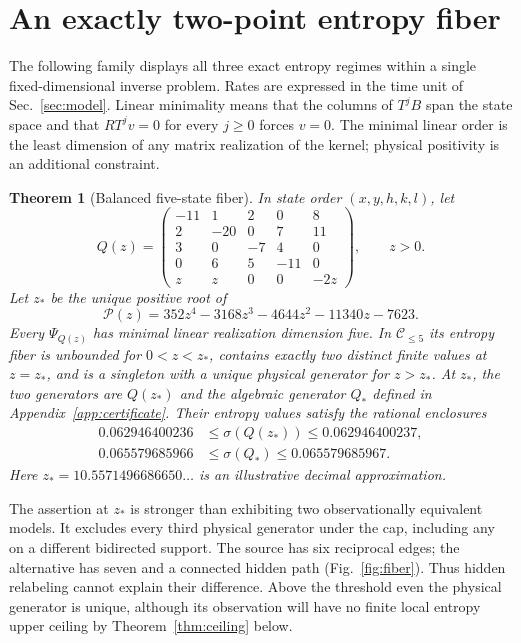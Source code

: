 \documentclass[aps,pre,onecolumn,11pt,longbibliography,notitlepage]{revtex4-2}
\newtheorem{theorem}{Theorem}
\newcommand{\1}{\mathbf 1}
\newcommand{\C}{\mathcal C}
\newcommand{\sig}{\sigma}
\newcommand{\zs}{z_*}
\begin{document}
\section{An exactly two-point entropy fiber}\label{sec:balanced}
The following family displays all three exact entropy regimes within a single fixed-dimensional inverse problem. Rates are expressed in the time unit of Sec.~\ref{sec:model}. Linear minimality means that the columns of $T^jB$ span the state space and that $RT^jv=0$ for every $j\ge0$ forces $v=0$. The minimal linear order is the least dimension of any matrix realization of the kernel; physical positivity is an additional constraint.
\begin{theorem}[Balanced five-state fiber]\label{thm:balanced}
In state order $(x,y,h,k,l)$, let
\begin{equation}
 Q(z)=\begin{pmatrix}
 -11&1&2&0&8\\2&-20&0&7&11\\3&0&-7&4&0\\
 0&6&5&-11&0\\z&z&0&0&-2z
 \end{pmatrix},\qquad z>0.\label{eq:theta}
\end{equation}
Let $\zs$ be the unique positive root of
\begin{equation}
 \mathcal P(z)=352z^4-3168z^3-4644z^2-11340z-7623.\label{eq:quartic}
\end{equation}
Every $\Psi_{Q(z)}$ has minimal linear realization dimension five. In $\C_{\le5}$ its entropy fiber is unbounded for $0<z<\zs$, contains exactly two distinct finite values at $z=\zs$, and is a singleton with a unique physical generator for $z>\zs$. At $\zs$, the two generators are $Q(\zs)$ and the algebraic generator $Q_*$ defined in Appendix~\ref{app:certificate}. Their entropy values satisfy the rational enclosures
\begin{align}
 0.062946400236&\le\sig(Q(\zs))\le0.062946400237,\label{eq:sig1}\\
 0.065579685966&\le\sig(Q_*)\le0.065579685967.\label{eq:sig2}
\end{align}
Here $\zs=10.5571496686650\ldots$ is an illustrative decimal approximation.
\end{theorem}

The assertion at $\zs$ is stronger than exhibiting two observationally equivalent models. It excludes every third physical generator under the cap, including any on a different bidirected support. The source has six reciprocal edges; the alternative has seven and a connected hidden path (Fig.~\ref{fig:fiber}). Thus hidden relabeling cannot explain their difference. Above the threshold even the physical generator is unique, although its observation will have no finite local entropy upper ceiling by Theorem~\ref{thm:ceiling} below.
\end{document}
